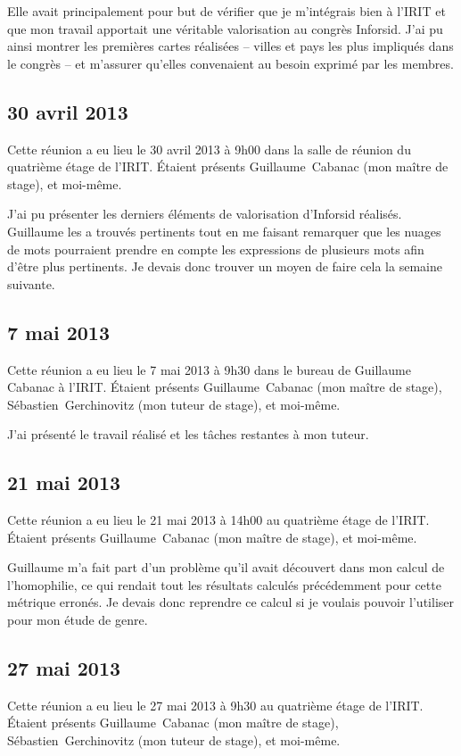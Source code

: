 		Elle avait principalement pour but de vérifier que je m'intégrais bien à l'IRIT et que mon travail apportait une véritable valorisation au congrès Inforsid. J'ai pu ainsi montrer les premières cartes réalisées -- villes et pays les plus impliqués dans le congrès -- et m'assurer qu'elles convenaient au besoin exprimé par les membres.
	
	
	\subsection{30 avril 2013}
		Cette réunion a eu lieu le 30 avril 2013 à 9h00 dans la salle de réunion du quatrième étage de l'IRIT. Étaient présents Guillaume~Cabanac (mon maître de stage), et moi-même.
		
		J'ai pu présenter les derniers éléments de valorisation d'Inforsid réalisés. Guillaume les a trouvés pertinents tout en me faisant remarquer que les nuages de mots pourraient prendre en compte les expressions de plusieurs mots afin d'être plus pertinents. Je devais donc trouver un moyen de faire cela la semaine suivante.
	
	
	\subsection{7 mai 2013}
		Cette réunion a eu lieu le 7 mai 2013 à 9h30 dans le bureau de Guillaume Cabanac à l'IRIT. Étaient présents Guillaume~Cabanac (mon maître de stage), Sébastien~Gerchinovitz (mon tuteur de stage), et moi-même.
		
		J'ai présenté le travail réalisé et les tâches restantes à mon tuteur.
	
	
	\subsection{21 mai 2013}
		Cette réunion a eu lieu le 21 mai 2013 à 14h00 au quatrième étage de l'IRIT. Étaient présents Guillaume~Cabanac (mon maître de stage), et moi-même.
		
	Guillaume m'a fait part d'un problème qu'il avait découvert dans mon calcul de l'homophilie, ce qui rendait tout les résultats calculés précédemment pour cette métrique erronés. Je devais donc reprendre ce calcul si je voulais pouvoir l'utiliser pour mon étude de genre.
	
	
	\subsection{27 mai 2013}
		Cette réunion a eu lieu le 27 mai 2013 à 9h30 au quatrième étage de l'IRIT. Étaient présents Guillaume~Cabanac (mon maître de stage), Sébastien~Gerchinovitz (mon tuteur de stage), et moi-même.
		
